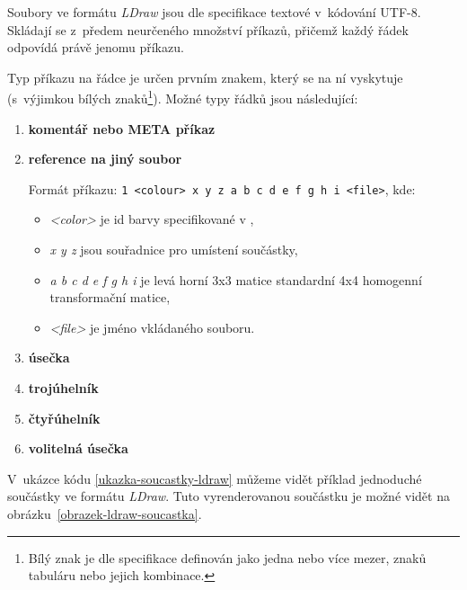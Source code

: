         Soubory ve formátu \textit{LDraw} jsou dle specifikace \autocite{ldraw:file:specification} textové v~kódování \gls{UTF-8}. Skládají se z~předem neurčeného množství příkazů, přičemž každý řádek odpovídá právě jenomu příkazu.

        Typ příkazu na řádce je určen prvním znakem, který se na ní vyskytuje (s~výjimkou bílých znaků\footnote{Bílý znak je dle specifikace \autocite{ldraw:file:specification} definován jako jedna nebo více mezer, znaků tabuláru nebo jejich kombinace.}). Možné typy řádků jsou následující: 
        
        \begin{enumerate}
            \item[0:] \textbf{komentář nebo META příkaz}

            \item[1:] \textbf{reference na jiný soubor}

                Formát příkazu: \texttt{1 <colour> x y z a b c d e f g h i <file>}, kde: 
                \begin{itemize}
                    \item \textit{<color>} je id barvy specifikované v \autocite{ldraw:colors},
                    \item \textit{x y z} jsou souřadnice pro umístení součástky,
                    \item \textit{a b c d e f g h i} je levá horní 3x3 matice standardní 4x4 homogenní transformační matice,
                    \item \textit{<file>} je jméno vkládaného souboru.
                \end{itemize}
                

            \item[2:] \textbf{úsečka}
            \item[3:] \textbf{trojúhelník}
            \item[4:] \textbf{čtyřúhelník}
            \item[5:] \textbf{volitelná úsečka}
        \end{enumerate}

        V~ukázce kódu \ref{ukazka-soucastky-ldraw} můžeme vidět příklad jednoduché součástky ve formátu \textit{LDraw}. Tuto vyrenderovanou součástku je možné vidět na obrázku~\ref{obrazek-ldraw-soucastka}.
            
